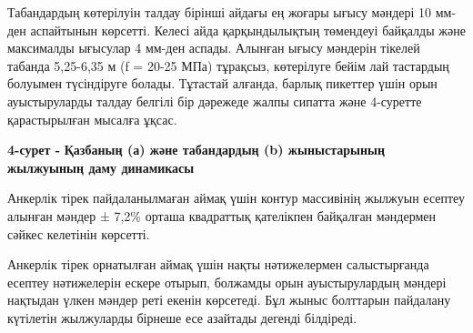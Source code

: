 Табандардың көтерілуін талдау бірінші айдағы ең жоғары ығысу мәндері 10
мм-ден аспайтынын көрсетті. Келесі айда қарқындылықтың төмендеуі
байқалды және максималды ығысулар 4 мм-ден аспады. Алынған ығысу
мәндерін тікелей табанда 5,25-6,35 м (f = 20-25 МПа) тұрақсыз,
көтерілуге бейім лай тастардың болуымен түсіндіруге болады. Тұтастай
алғанда, барлық пикеттер үшін орын ауыстыруларды талдау белгілі бір
дәрежеде жалпы сипатта және 4-суретте қарастырылған мысалға ұқсас.


{\bfseries 4-сурет -} {\bfseries Қазбаның (а) және табандардың (b)
жыныстарының жылжуының даму динамикасы}

Анкерлік тірек пайдаланылмаған аймақ үшін контур массивінің жылжуын
есептеу алынған мәндер ± 7,2\% орташа квадраттық қателікпен байқалған
мәндермен сәйкес келетінін көрсетті.

Анкерлік тірек орнатылған аймақ үшін нақты нәтижелермен салыстырғанда
есептеу нәтижелерін ескере отырып, болжамды орын ауыстырулардың мәндері
нақтыдан үлкен мәндер реті екенін көрсетеді. Бұл жыныс болттарын
пайдалану күтілетін жылжуларды бірнеше есе азайтады дегенді білдіреді.

